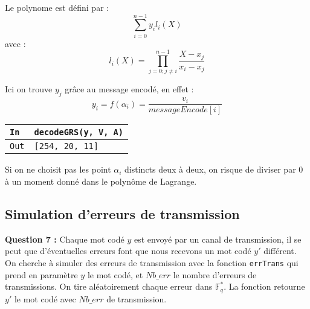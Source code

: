 \documentclass[titlepage]{article}
\begin{document}
        Le polynome est défini par :
        \[\sum_{i=0}^{n-1}y_il_i(X)\]
        avec :
        \[l_i(X) = \prod_{j = 0; j \neq i}^{n - 1}\frac{X-x_j}{x_i-x_j} \]

        Ici on trouve $y_j$ grâce au message encodé, en effet : 
        \[y_i = f(\alpha_i) = \frac{v_i}{messageEncode[i]}\]

        

        \begin{tabularx}{12cm}{|p{0.60cm}|X|}
            \hline
            \rowcolor{gray}
            \texttt{In}
            & 
            \texttt{decodeGRS(y, V, A)}
            \\
            \hline
            \texttt{Out}
            &
            \texttt{[254, 20, 11]}
            \\
            \hline
        \end{tabularx}
        \bigbreak

        Si on ne choisit pas les point $\alpha_i$ distincts deux à deux, on risque de diviser par 0 à un moment donné dans le polynôme de Lagrange.

        \subsection{Simulation d’erreurs de transmission}
        \textbf{Question 7 :}
        Chaque mot codé $y$ est envoyé par un canal de transmission, il se peut que d'éventuelles erreurs font que nous recevons un mot codé $y'$ différent.
        On cherche à simuler des erreurs de transmission avec la fonction \texttt{errTrans} qui prend en paramètre $y$ le mot codé, et $Nb\_err$ le nombre d'erreurs de transmissions.
        On tire aléatoirement chaque erreur dans $\mathbb{F}_q^*$. La fonction retourne $y'$ le mot codé avec $Nb\_err$ de transmission.

        
\end{document}
